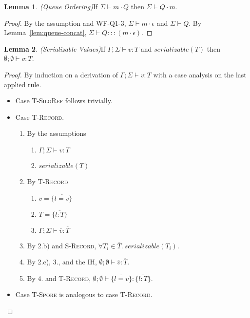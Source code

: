 \documentclass{article}
\theoremstyle{definition}
\newtheorem{lem}{Lemma}[section]
\newcommand{\seq}[1]{\overline{#1}}
\begin{document}
\begin{lem}
\emph{(Queue Ordering)}\label{lem:queue-ordering}
If $\Sigma \vdash m \cdot Q$ then $\Sigma \vdash Q \cdot m$.
\end{lem}
\begin{proof}
By the assumption and \textsc{WF-Q1-3}, $\Sigma \vdash m \cdot \epsilon$ and $\Sigma \vdash Q$. By Lemma~\ref{lem:queue-concat}, $\Sigma \vdash Q ::: (m \cdot \epsilon)$.
\end{proof}

\begin{lem}
\emph{(Serializable Values)}\label{lem:ser-values}
If $\Gamma ; \Sigma \vdash v : T$ and $serializable(T)$ then $\emptyset ; \emptyset \vdash v : T$.
\end{lem}
\begin{proof}
By induction on a derivation of $\Gamma ; \Sigma \vdash v : T$ with a case analysis on the last applied rule.

\begin{itemize}
\item Case \textsc{T-SiloRef} follows trivially.

\item Case \textsc{T-Record}.
\begin{enumerate}
\item By the assumptions
  \begin{enumerate}[label=(\alph*)]
  \item $\Gamma ; \Sigma \vdash v : T$
  \item $serializable(T)$
  \end{enumerate}
\item By \textsc{T-Record}
  \begin{enumerate}[label=(\alph*)]
  \item $v = \{\seq{l = v}\}$
  \item $T = \{\seq{l : T}\}$
  \item $\Gamma ; \Sigma \vdash \seq{v} : \seq{T}$
  \end{enumerate}
\item By 2.b) and \textsc{S-Record}, $\forall T_i \in \seq{T}.~serializable(T_i)$.
\item By 2.c), 3., and the IH, $\emptyset ; \emptyset \vdash \seq{v} : \seq{T}$.
\item By 4. and \textsc{T-Record}, $\emptyset ; \emptyset \vdash \{\seq{l = v}\} : \{\seq{l : T}\}$.
\end{enumerate}

\item Case \textsc{T-Spore} is analogous to case \textsc{T-Record}.
\end{itemize}
\end{proof}
\end{document}
